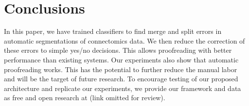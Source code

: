 \section{Conclusions}

In this paper, we have trained classifiers to find merge and split errors in automatic segmentations of connectomics data. We then reduce the correction of these errors to simple yes/no decisions. This allows proofreading with better performance than existing systems.
Our experiments also show that automatic proofreading works. This has the potential to further reduce the manual labor and will be the target of future research. To encourage testing of our proposed architecture and replicate our experiments, we provide our framework and data as free and open research at (link omitted for review).